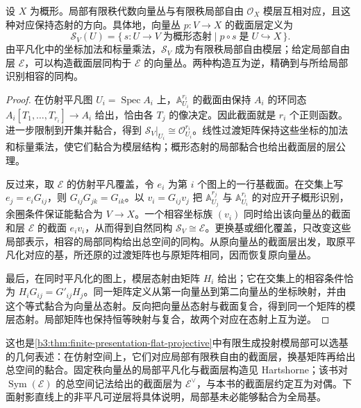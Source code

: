 \begin{proposition}\label{b3:prop:locally-free-vector-bundle-equivalence}
	设 \(X\) 为概形。局部有限秩代数向量丛与有限秩局部自由 \(\mathcal O_X\) 模层互相对应，且这种对应保持态射的方向。具体地，向量丛 \(p:V\rightarrow X\) 的截面层定义为
	\[
		\mathcal S_V(U)=\{\,s:U\rightarrow V\;\text{为概形态射}\mid p\circ s\;\text{是}\;U\hookrightarrow X\,\}.
	\]
	由平凡化中的坐标加法和标量乘法，\(\mathcal S_V\) 成为有限秩局部自由模层；给定局部自由层 \(\mathcal E\)，可以构造截面层同构于 \(\mathcal E\) 的向量丛。两种构造互为逆，精确到与所给局部识别相容的同构。
\end{proposition}
\begin{proof}
	在仿射平凡图 \(U_i=\operatorname{Spec}A_i\) 上，\(\mathbb A_{U_i}^{r_i}\) 的截面由保持 \(A_i\) 的环同态 \(A_i[T_1,\ldots,T_{r_i}]\rightarrow A_i\) 给出，恰由各 \(T_j\) 的像决定。因此截面就是 \(r_i\) 个正则函数。进一步限制到开集并黏合，得到 \(\mathcal S_V|_{U_i}\cong\mathcal O_{U_i}^{r_i}\)。线性过渡矩阵保持这些坐标的加法和标量乘法，使它们黏合为模层结构；概形态射的局部黏合也给出截面层的层公理。

	反过来，取 \(\mathcal E\) 的仿射平凡覆盖，令 \(e_i\) 为第 \(i\) 个图上的一行基截面。在交集上写 \(e_j=e_iG_{ij}\)，则 \(G_{ij}G_{jk}=G_{ik}\)。以 \(v_i=G_{ij}v_j\) 把 \(\mathbb A_{U_j}^{r_j}\) 与 \(\mathbb A_{U_i}^{r_i}\) 的对应开子概形识别，余圈条件保证能黏合为 \(V\rightarrow X\)。一个相容坐标族 \((v_i)\) 同时给出该向量丛的截面和层 \(\mathcal E\) 的截面 \(e_iv_i\)，从而得到自然同构 \(\mathcal S_V\cong\mathcal E\)。更换基或细化覆盖，只改变这些局部表示，相容的局部同构给出总空间的同构。从原向量丛的截面层出发，取原平凡化对应的基，所还原的过渡矩阵也与原矩阵相同，因而恢复原向量丛。

	最后，在同时平凡化的图上，模层态射由矩阵 \(H_i\) 给出；它在交集上的相容条件恰为 \(H_iG_{ij}=G'_{ij}H_j\)。同一矩阵定义从第一向量丛到第二向量丛的坐标映射，并由这个等式黏合为向量丛态射。反向把向量丛态射与截面复合，得到同一个矩阵的模层态射。局部矩阵也保持恒等映射与复合，故两个对应在态射上互为逆。
\end{proof}

这也是\cref{b3:thm:finite-presentation-flat-projective}中有限生成投射模局部可以选基的几何表述：在仿射空间上，它们对应局部有限秩自由的截面层，换基矩阵再给出总空间的黏合。固定秩向量丛的局部平凡化与截面层构造见 Hartshorne\cite[Chapter II, Exercise 5.18, pp. 128--129]{Hartshorne1977}；该书对 \(\operatorname{Sym}(\mathcal E)\) 的总空间记法给出的截面层为 \(\mathcal E^\vee\)，与本书的截面层约定互为对偶。下面射影直线上的非平凡可逆层将具体说明，局部基未必能够黏合为全局基。

